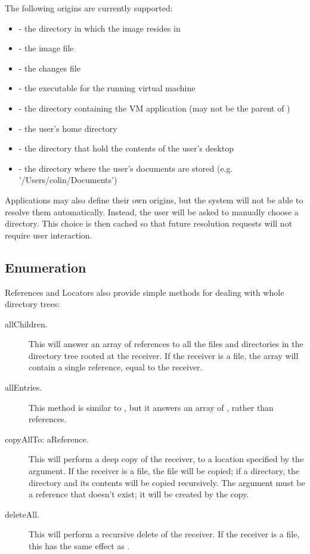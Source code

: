 \documentclass[a4paper,10pt,twoside]{book}
\begin{document}
The following origins are currently supported:

\begin{itemize}
\item {} - the directory in which the image resides in
\item{} - the image file
\item{} - the changes file
\item{} - the executable for the running virtual machine
\item{} - the directory containing the VM application (may not be the parent of )
\item{} - the user's home directory
\item{} - the directory that hold the contents of the user's desktop
\item{} - the directory where the user's documents are stored (e.g. '/Users/colin/Documents')
\end{itemize}

Applications may also define their own origins, but the system will not be able to resolve them automatically. Instead, the user will be asked to manually choose a directory. This choice is then cached so that future resolution requests will not require user interaction.

\subsection{Enumeration}

References and Locators also provide simple methods for dealing with whole directory trees:

\begin{description}
\item[allChildren.]

This will answer an array of references to all the files and directories in the directory tree rooted at the receiver. If the receiver is a file, the array will contain a single reference, equal to the receiver.

\item[allEntries.]
This method is similar to , but it answers an array of , rather than references.

\item[copyAllTo: aReference.]

This will perform a deep copy of the receiver, to a location specified by the argument. If the receiver is a file, the file will be copied; if a directory, the directory and its contents will be copied recursively. The argument must be a reference that doesn't exist; it will be created by the copy.

\item[deleteAll.]

This will perform a recursive delete of the receiver. If the receiver is a file, this has the same effect as .
\end{description}
\end{document}
